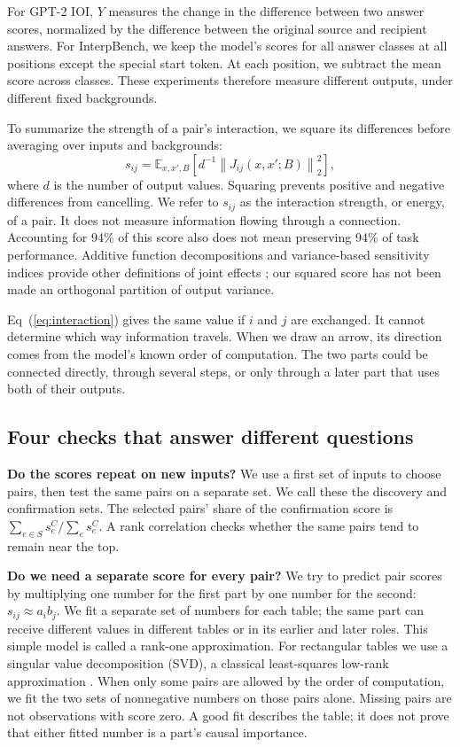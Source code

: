 \documentclass[11pt,letterpaper]{article}
\newcommand{\E}{\mathbb E}
\newcommand{\norm}[1]{\left\lVert#1\right\rVert}
\begin{document}
For GPT-2 IOI, $Y$ measures the change in the difference between two answer
scores, normalized by the difference between the original source and recipient
answers. For InterpBench, we keep the model's scores for all answer classes at
all positions except the special start token. At each position, we subtract
the mean score across classes. These experiments therefore measure different
outputs, under different fixed backgrounds.

To summarize the strength of a pair's interaction, we square its differences
before averaging over inputs and backgrounds:
\begin{equation}
 s_{ij}=\E_{x,x',B}\!\left[d^{-1}\norm{J_{ij}(x,x';B)}_2^2\right],
 \label{eq:energy}
\end{equation}
where $d$ is the number of output values. Squaring prevents positive and
negative differences from cancelling. We refer to $s_{ij}$ as the interaction
strength, or energy, of a pair. It does not measure information flowing through
a connection. Accounting for 94\% of this score also does not mean preserving
94\% of task performance. Additive function decompositions and variance-based
sensitivity indices provide other definitions of joint effects
\cite{hooker2004additive,sobol2001global}; our squared score has not been
made an orthogonal partition of output variance.

Eq~(\ref{eq:interaction}) gives the same value if $i$ and $j$ are exchanged.
It cannot determine which way information travels. When we draw an arrow, its
direction comes from the model's known order of computation. The two parts
could be connected directly, through several steps, or only through a later
part that uses both of their outputs.

\subsection*{Four checks that answer different questions}
\textbf{Do the scores repeat on new inputs?} We use a first set of inputs to
choose pairs, then test the same pairs on a separate set. We call these the
discovery and confirmation sets. The selected pairs' share of the confirmation
score is $\sum_{e\in S}s_e^{C}/\sum_e s_e^{C}$. A rank correlation checks whether
the same pairs tend to remain near the top.

\textbf{Do we need a separate score for every pair?} We try to predict pair
scores by multiplying one number for the first part by one number for the
second: $s_{ij}\approx a_i b_j$. We fit a separate set of numbers for each table;
the same part can receive different values in different tables or in its
earlier and later roles. This simple model is called a rank-one approximation.
For rectangular tables we use a singular value decomposition
(SVD), a classical least-squares low-rank approximation
\cite{eckart1936approximation}. When only some pairs are allowed by the order of computation, we fit
the two sets of nonnegative numbers on those pairs alone. Missing pairs are
not observations with score zero. A good fit describes the table; it does not
prove that either fitted number is a part's causal importance.
\end{document}
